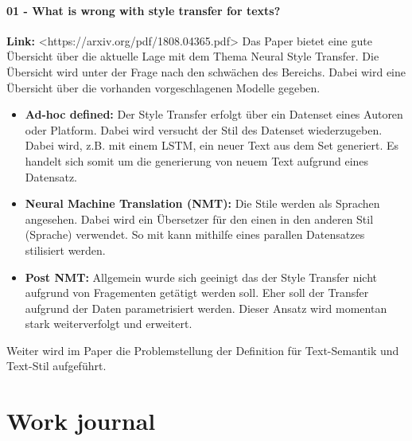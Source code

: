 \subsubsection{01 - What is wrong with style transfer for texts?}
\textbf{Link: } <https://arxiv.org/pdf/1808.04365.pdf>
\newline
\newline
Das Paper bietet eine gute Übersicht über die aktuelle Lage mit dem Thema Neural Style Transfer. Die Übersicht wird
unter der Frage nach den schwächen des Bereichs.
\newline
\newline
Dabei wird eine Übersicht über die vorhanden vorgeschlagenen Modelle gegeben.
\begin{itemize}
    \item \textbf{Ad-hoc defined:} Der Style Transfer erfolgt über ein Datenset eines Autoren oder Platform. Dabei wird
    versucht der Stil des Datenset wiederzugeben. Dabei wird, z.B. mit einem LSTM, ein neuer Text aus dem Set generiert.
    Es handelt sich somit um die generierung von neuem Text aufgrund eines Datensatz.
    \item \textbf{Neural Machine Translation (NMT):} Die Stile werden als Sprachen angesehen. Dabei wird ein Übersetzer
    für den einen in den anderen Stil (Sprache) verwendet. So mit kann mithilfe eines parallen Datensatzes stilisiert
    werden.
    \item \textbf{Post NMT:} Allgemein wurde sich geeinigt das der Style Transfer nicht aufgrund von Fragementen
    getätigt werden soll. Eher soll der Transfer aufgrund der Daten parametrisiert werden. Dieser Ansatz wird momentan
    stark weiterverfolgt und erweitert.
\end{itemize}
Weiter wird im Paper die Problemstellung der Definition für Text-Semantik und Text-Stil aufgeführt.

\chapter{Work journal}
\label{ch:Work-Journal}

\landscapevalues


